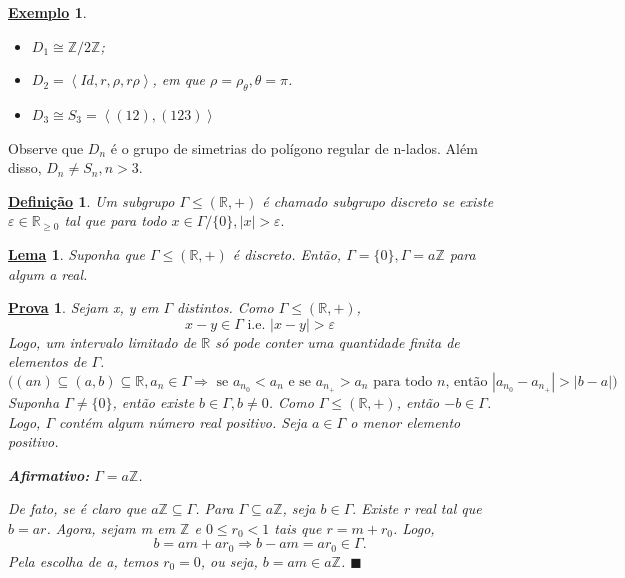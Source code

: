\documentclass{article}
\newtheorem*{def*}{\underline{Defini\c c\~ao}}
\newtheorem{example*}{\underline{Exemplo}}
\newtheorem*{proof*}{\underline{Prova}}
\newtheorem*{lemma*}{\underline{Lema}}
\renewcommand\qedsymbol{$\blacksquare$}
\begin{document}
\begin{example*}
 \begin{itemize}
   \item[1)] \(D_{1}\cong{\mathbb{Z}/2 \mathbb{Z}}\);
   \item[2)] \(D_{2} = \left< Id, r, \rho , r\rho  \right>\), em que \(\rho = \rho _{\theta }, \theta =\pi \).
   \item[3)] \(D_{3}\cong{S_{3}} = \left< (12), (123) \right>\)
 \end{itemize}
\end{example*}
Observe que \(D_{n}\) é o grupo de simetrias do polígono regular de n-lados. 
Além disso, \(D_{n}\neq S_{n}, n >3\).
\begin{def*}
  Um subgrupo \(\Gamma\leq (\mathbb{R}, +)\) é chamado subgrupo discreto se existe
  \(\varepsilon  \in \mathbb{R}_{\geq 0}\) tal que para todo \(x\in\Gamma/\{0\}, |x| > \varepsilon .\)
\end{def*}
\begin{lemma*}
  Suponha que \(\Gamma\leq (\mathbb{R}, +)\) é discreto. Então, \(\Gamma =\{0\}, \Gamma =a \mathbb{Z}\)
  para algum a real.
\end{lemma*}
\begin{proof*}
  Sejam x, y em \(\Gamma \) distintos. Como \(\Gamma\leq (\mathbb{R}, +)\), 
    \[
      x - y\in \Gamma  \text{ i.e. }  |x-y| > \varepsilon 
    \]
    Logo, um intervalo limitado de \(\mathbb{R}\) só pode conter uma quantidade finita
    de elementos de \(\Gamma \). 
      \[
        \biggl((an)\subseteq{(a,b)\subseteq{\mathbb{R}}}, a_{n}\in \Gamma \Rightarrow \text{ se } a_{n_{0}} < a_{n}\text{ e se } a_{n_{+}} > a_{n}\text{ para todo } n \text{, então } |a_{n_{0}}-a_{n_{+}}| > |b-a| \biggr)
      \]
      Suponha \(\Gamma \neq\{0\}\), então existe \(b\in \Gamma , b\neq0\). Como
      \(\Gamma\leq (\mathbb{R}, +)\), então \(-b\in \Gamma \). Logo, \(\Gamma \) contém 
      algum número real positivo. Seja \(a\in\Gamma \) o menor elemento positivo.

      \textbf{Afirmativo: } \(\Gamma =a \mathbb{Z}\). 

      De fato, se é claro que \(a \mathbb{Z} \subseteq{\Gamma }\). Para \(\Gamma \subseteq{a \mathbb{Z}}\),
      seja \(b\in \Gamma.\) Existe r real tal que \(b=ar\). Agora, sejam m em \(\mathbb{Z}\) 
      e \(0\leq r_{0} < 1\) tais que \(r = m + r_{0}\). Logo, 
        \[
          b = am + ar_{0} \Rightarrow b-am = ar_{0}\in\Gamma.
        \]
        Pela escolha de a, temos \(r_{0} = 0\), ou seja, \(b=am\in a \mathbb{Z}\). \qedsymbol
\end{proof*}
\end{document}

